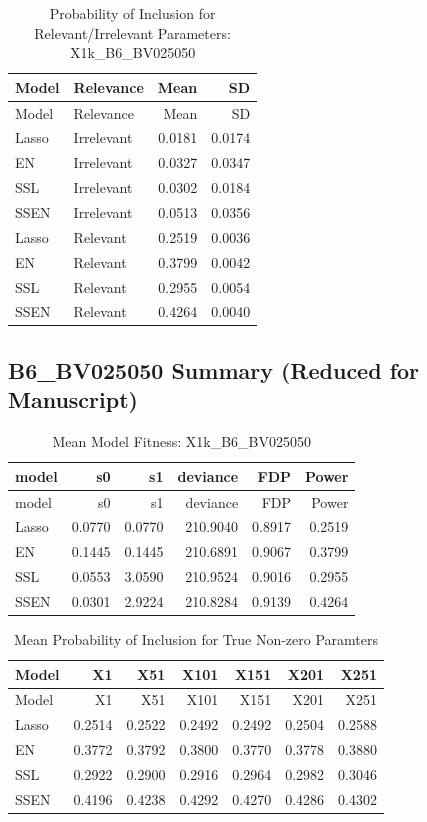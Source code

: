 \documentclass[
]{article}
\begin{document}
\begin{longtable}[]{@{}llrr@{}}
\caption{Probability of Inclusion for Relevant/Irrelevant Parameters:
X1k\_B6\_BV025050}\tabularnewline
\toprule
Model & Relevance & Mean & SD \\
\midrule
\endfirsthead
\toprule
Model & Relevance & Mean & SD \\
\midrule
\endhead
Lasso & Irrelevant & 0.0181 & 0.0174 \\
EN & Irrelevant & 0.0327 & 0.0347 \\
SSL & Irrelevant & 0.0302 & 0.0184 \\
SSEN & Irrelevant & 0.0513 & 0.0356 \\
Lasso & Relevant & 0.2519 & 0.0036 \\
EN & Relevant & 0.3799 & 0.0042 \\
SSL & Relevant & 0.2955 & 0.0054 \\
SSEN & Relevant & 0.4264 & 0.0040 \\
\bottomrule
\end{longtable}

\hypertarget{b6_bv025050-summary-reduced-for-manuscript}{%
\subsection{B6\_BV025050 Summary (Reduced for
Manuscript)}\label{b6_bv025050-summary-reduced-for-manuscript}}

\begin{longtable}[]{@{}lrrrrr@{}}
\caption{Mean Model Fitness: X1k\_B6\_BV025050}\tabularnewline
\toprule
model & s0 & s1 & deviance & FDP & Power \\
\midrule
\endfirsthead
\toprule
model & s0 & s1 & deviance & FDP & Power \\
\midrule
\endhead
Lasso & 0.0770 & 0.0770 & 210.9040 & 0.8917 & 0.2519 \\
EN & 0.1445 & 0.1445 & 210.6891 & 0.9067 & 0.3799 \\
SSL & 0.0553 & 3.0590 & 210.9524 & 0.9016 & 0.2955 \\
SSEN & 0.0301 & 2.9224 & 210.8284 & 0.9139 & 0.4264 \\
\bottomrule
\end{longtable}

\begin{longtable}[]{@{}lrrrrrr@{}}
\caption{Mean Probability of Inclusion for True Non-zero
Paramters}\tabularnewline
\toprule
Model & X1 & X51 & X101 & X151 & X201 & X251 \\
\midrule
\endfirsthead
\toprule
Model & X1 & X51 & X101 & X151 & X201 & X251 \\
\midrule
\endhead
Lasso & 0.2514 & 0.2522 & 0.2492 & 0.2492 & 0.2504 & 0.2588 \\
EN & 0.3772 & 0.3792 & 0.3800 & 0.3770 & 0.3778 & 0.3880 \\
SSL & 0.2922 & 0.2900 & 0.2916 & 0.2964 & 0.2982 & 0.3046 \\
SSEN & 0.4196 & 0.4238 & 0.4292 & 0.4270 & 0.4286 & 0.4302 \\
\bottomrule
\end{longtable}
\end{document}

